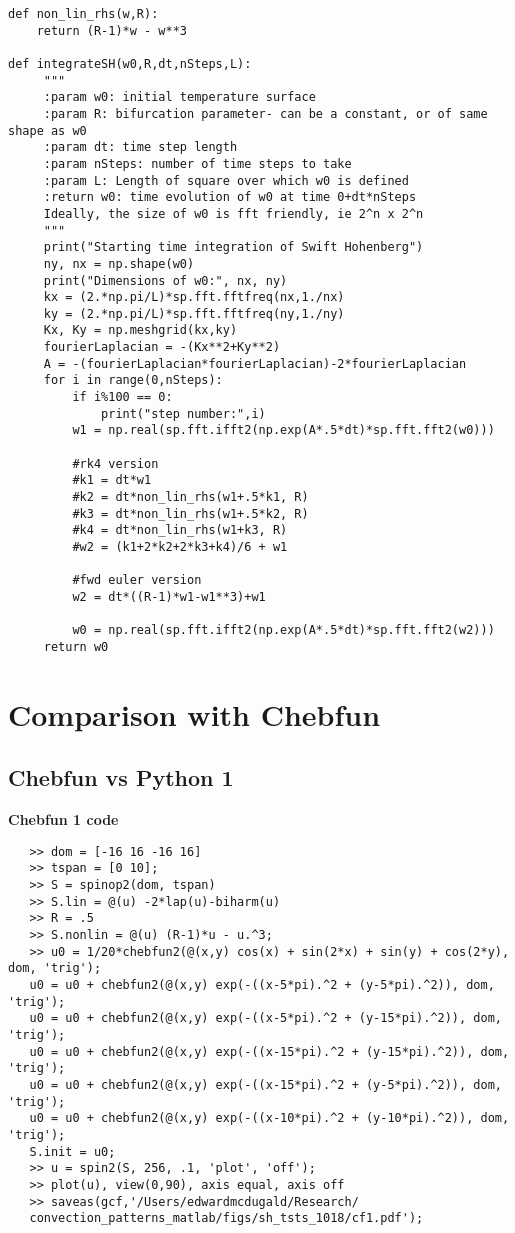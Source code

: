 \documentclass[12pt]{article}
\begin{document}
    \begin{verbatim}
def non_lin_rhs(w,R):
    return (R-1)*w - w**3

def integrateSH(w0,R,dt,nSteps,L):
     """
     :param w0: initial temperature surface
     :param R: bifurcation parameter- can be a constant, or of same shape as w0
     :param dt: time step length
     :param nSteps: number of time steps to take
     :param L: Length of square over which w0 is defined
     :return w0: time evolution of w0 at time 0+dt*nSteps
     Ideally, the size of w0 is fft friendly, ie 2^n x 2^n
     """
     print("Starting time integration of Swift Hohenberg")
     ny, nx = np.shape(w0)
     print("Dimensions of w0:", nx, ny)
     kx = (2.*np.pi/L)*sp.fft.fftfreq(nx,1./nx)
     ky = (2.*np.pi/L)*sp.fft.fftfreq(ny,1./ny)
     Kx, Ky = np.meshgrid(kx,ky)
     fourierLaplacian = -(Kx**2+Ky**2)
     A = -(fourierLaplacian*fourierLaplacian)-2*fourierLaplacian
     for i in range(0,nSteps):
         if i%100 == 0:
             print("step number:",i)
         w1 = np.real(sp.fft.ifft2(np.exp(A*.5*dt)*sp.fft.fft2(w0)))

         #rk4 version
         #k1 = dt*w1
         #k2 = dt*non_lin_rhs(w1+.5*k1, R)
         #k3 = dt*non_lin_rhs(w1+.5*k2, R)
         #k4 = dt*non_lin_rhs(w1+k3, R)
         #w2 = (k1+2*k2+2*k3+k4)/6 + w1

         #fwd euler version
         w2 = dt*((R-1)*w1-w1**3)+w1

         w0 = np.real(sp.fft.ifft2(np.exp(A*.5*dt)*sp.fft.fft2(w2)))
     return w0
    \end{verbatim}

\section{Comparison with Chebfun}
\subsection{Chebfun vs Python 1}
\textbf{Chebfun 1 code}
\begin{verbatim}
   >> dom = [-16 16 -16 16]
   >> tspan = [0 10];
   >> S = spinop2(dom, tspan)
   >> S.lin = @(u) -2*lap(u)-biharm(u)
   >> R = .5
   >> S.nonlin = @(u) (R-1)*u - u.^3;
   >> u0 = 1/20*chebfun2(@(x,y) cos(x) + sin(2*x) + sin(y) + cos(2*y), dom, 'trig');
   u0 = u0 + chebfun2(@(x,y) exp(-((x-5*pi).^2 + (y-5*pi).^2)), dom, 'trig');
   u0 = u0 + chebfun2(@(x,y) exp(-((x-5*pi).^2 + (y-15*pi).^2)), dom, 'trig');
   u0 = u0 + chebfun2(@(x,y) exp(-((x-15*pi).^2 + (y-15*pi).^2)), dom, 'trig');
   u0 = u0 + chebfun2(@(x,y) exp(-((x-15*pi).^2 + (y-5*pi).^2)), dom, 'trig');
   u0 = u0 + chebfun2(@(x,y) exp(-((x-10*pi).^2 + (y-10*pi).^2)), dom, 'trig');
   S.init = u0;
   >> u = spin2(S, 256, .1, 'plot', 'off');
   >> plot(u), view(0,90), axis equal, axis off
   >> saveas(gcf,'/Users/edwardmcdugald/Research/
   convection_patterns_matlab/figs/sh_tsts_1018/cf1.pdf');
\end{verbatim}
\end{document}
